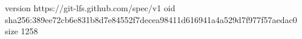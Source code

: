 version https://git-lfs.github.com/spec/v1
oid sha256:389ee72cb6e831b8d7e84552f7decea98411d616941a4a529d7f977f57aedac0
size 1258
